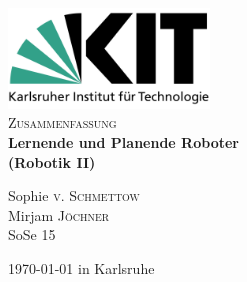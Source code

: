 \documentclass[11pt]{scrartcl}
\begin{document}
\begin{titlepage}

\begin{center}


\includegraphics[width=0.4\textwidth]{Logo_KIT.png}\\[1cm]    



\textsc{\Large Zusammenfassung}\\[0.5cm]


{ \huge \bfseries Lernende und Planende Roboter}\\[0.4cm]
{ \large \bfseries (Robotik II)}
\bigskip


Sophie \textsc{v. Schmettow}\\
Mirjam \textsc{Jöchner}\\
SoSe 15\\



\vfill

{\large \today{} in Karlsruhe} 

\end{center}


\end{titlepage}


\tableofcontents
\newpage


\end{document}
